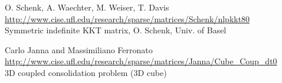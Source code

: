 	{
		{
			O. Schenk, A. Waechter, M. Weiser, T. Davis	
		}
		{
			\url{http://www.cise.ufl.edu/research/sparse/matrices/Schenk/nlpkkt80} \\
			Symmetric indefinite KKT matrix, O. Schenk, Univ. of Basel
		}
	} 

	{
		{
			Carlo Janna and Massimiliano Ferronato
		}
		{
			\url{http://www.cise.ufl.edu/research/sparse/matrices/Janna/Cube_Coup_dt0} \\
			3D coupled consolidation problem (3D cube)
		}
	} 